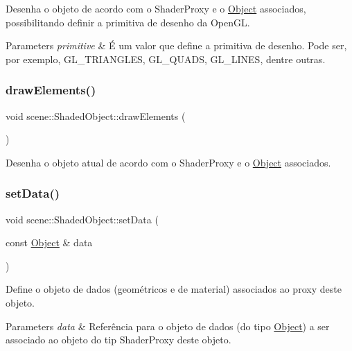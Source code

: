 Desenha o objeto de acordo com o Shader\+Proxy e o \mbox{\hyperlink{classscene_1_1_object}{Object}} associados, possibilitando definir a primitiva de desenho da Open\+GL. 
\begin{DoxyParams}{Parameters}
{\em primitive} & É um valor que define a primitiva de desenho. Pode ser, por exemplo, G\+L\+\_\+\+T\+R\+I\+A\+N\+G\+L\+ES, G\+L\+\_\+\+Q\+U\+A\+DS, G\+L\+\_\+\+L\+I\+N\+ES, dentre outras. \\
\hline
\end{DoxyParams}
\mbox{\label{classscene_1_1_shaded_object_aadbd7f9e0b8575199125cd9c12faeab0}} 
\subsubsection{\texorpdfstring{draw\+Elements()}{drawElements()}}
{\footnotesize\ttfamily void scene\+::\+Shaded\+Object\+::draw\+Elements (\begin{DoxyParamCaption}{ }\end{DoxyParamCaption})\hspace{0.3cm}{\ttfamily [inline]}}

Desenha o objeto atual de acordo com o Shader\+Proxy e o \mbox{\hyperlink{classscene_1_1_object}{Object}} associados. \mbox{\label{classscene_1_1_shaded_object_ae8d489b0c25c74840b11e2ba6897f145}} 
\subsubsection{\texorpdfstring{set\+Data()}{setData()}}
{\footnotesize\ttfamily void scene\+::\+Shaded\+Object\+::set\+Data (\begin{DoxyParamCaption}\item[{const \mbox{\hyperlink{classscene_1_1_object}{Object}} \&}]{data }\end{DoxyParamCaption})\hspace{0.3cm}{\ttfamily [inline]}}

Define o objeto de dados (geométricos e de material) associados ao proxy deste objeto. 
\begin{DoxyParams}{Parameters}
{\em data} & Referência para o objeto de dados (do tipo \mbox{\hyperlink{classscene_1_1_object}{Object}}) a ser associado ao objeto do tip Shader\+Proxy deste objeto. \\
\hline
\end{DoxyParams}
\mbox{\label{classscene_1_1_shaded_object_a44063851137c38331d1a5bc0921e5fe1}} 
